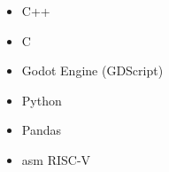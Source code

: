 \vspace{3pt}




\begin{itemize}
    \item \faCode\hspace{3pt} C++
    \item \faCode\hspace{3pt} C
    \item \faGamepad\hspace{3pt} Godot Engine (GDScript)
    \item \faPython\hspace{3pt} Python
    \item \faTable\hspace{3pt} Pandas
    \item \faMicrochip\hspace{3pt} asm RISC-V
\end{itemize}




